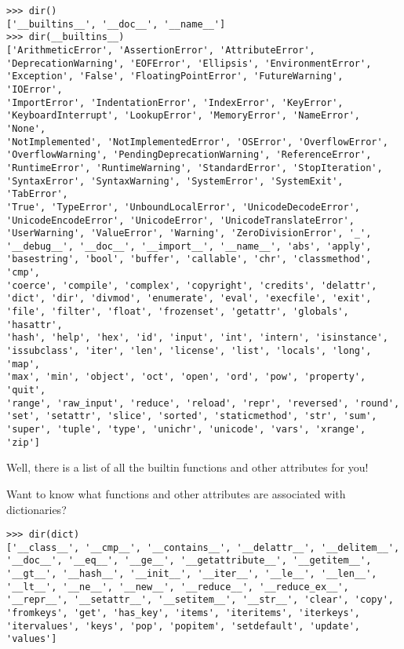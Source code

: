 \begin{Verbatim}[fontsize=\relsize{-2}]
>>> dir()
['__builtins__', '__doc__', '__name__']
>>> dir(__builtins__)
['ArithmeticError', 'AssertionError', 'AttributeError',
'DeprecationWarning', 'EOFError', 'Ellipsis', 'EnvironmentError',
'Exception', 'False', 'FloatingPointError', 'FutureWarning', 'IOError',
'ImportError', 'IndentationError', 'IndexError', 'KeyError',
'KeyboardInterrupt', 'LookupError', 'MemoryError', 'NameError', 'None',
'NotImplemented', 'NotImplementedError', 'OSError', 'OverflowError',
'OverflowWarning', 'PendingDeprecationWarning', 'ReferenceError',
'RuntimeError', 'RuntimeWarning', 'StandardError', 'StopIteration',
'SyntaxError', 'SyntaxWarning', 'SystemError', 'SystemExit', 'TabError',
'True', 'TypeError', 'UnboundLocalError', 'UnicodeDecodeError',
'UnicodeEncodeError', 'UnicodeError', 'UnicodeTranslateError',
'UserWarning', 'ValueError', 'Warning', 'ZeroDivisionError', '_',
'__debug__', '__doc__', '__import__', '__name__', 'abs', 'apply',
'basestring', 'bool', 'buffer', 'callable', 'chr', 'classmethod', 'cmp',
'coerce', 'compile', 'complex', 'copyright', 'credits', 'delattr',
'dict', 'dir', 'divmod', 'enumerate', 'eval', 'execfile', 'exit',
'file', 'filter', 'float', 'frozenset', 'getattr', 'globals', 'hasattr',
'hash', 'help', 'hex', 'id', 'input', 'int', 'intern', 'isinstance',
'issubclass', 'iter', 'len', 'license', 'list', 'locals', 'long', 'map',
'max', 'min', 'object', 'oct', 'open', 'ord', 'pow', 'property', 'quit',
'range', 'raw_input', 'reduce', 'reload', 'repr', 'reversed', 'round',
'set', 'setattr', 'slice', 'sorted', 'staticmethod', 'str', 'sum',
'super', 'tuple', 'type', 'unichr', 'unicode', 'vars', 'xrange', 'zip']
\end{Verbatim}

Well, there is a list of all the builtin functions and other attributes
for you!

Want to know what functions and other attributes are associated with
dictionaries?

\begin{Verbatim}[fontsize=\relsize{-2}]
>>> dir(dict)
['__class__', '__cmp__', '__contains__', '__delattr__', '__delitem__',
'__doc__', '__eq__', '__ge__', '__getattribute__', '__getitem__',
'__gt__', '__hash__', '__init__', '__iter__', '__le__', '__len__',
'__lt__', '__ne__', '__new__', '__reduce__', '__reduce_ex__',
'__repr__', '__setattr__', '__setitem__', '__str__', 'clear', 'copy',
'fromkeys', 'get', 'has_key', 'items', 'iteritems', 'iterkeys',
'itervalues', 'keys', 'pop', 'popitem', 'setdefault', 'update',
'values']
\end{Verbatim}

